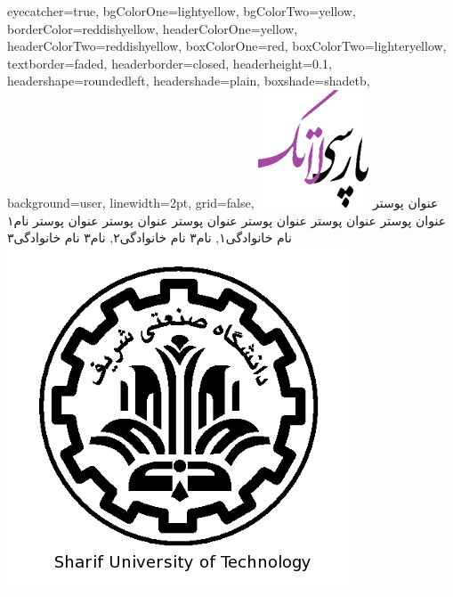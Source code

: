 \documentclass[debug,a0paper,portrait,persian]{xebaposter}
\begin{document}
      \begin{poster}%
      {
      eyecatcher=true,
      bgColorOne=lightyellow,
      bgColorTwo=yellow,
      borderColor=reddishyellow,
      headerColorOne=yellow,
      headerColorTwo=reddishyellow,
      boxColorOne=red,
      boxColorTwo=lighteryellow,
      textborder=faded,
      headerborder=closed,
      headerheight=0.1\textheight,
      headershape=roundedleft,
      headershade=plain,
      boxshade=shadetb,%
      background=user,%
      linewidth=2pt,
      grid=false,
      }
 {
      \includegraphics[height=0.07\textheight]{logo}
 }
 {عنوان پوستر عنوان پوستر عنوان پوستر عنوان پوستر عنوان پوستر عنوان پوستر عنوان پوستر 
}
 {\large نام۱ نام خانوادگی۱, نام۳ نام خانوادگی۲, نام۳ نام خانوادگی۳ 
 \\%
 {\normalsize\texttt{}}}
 {
    \includegraphics[height=0.07 \textheight]{shariflogo}
 }



\end{poster}
\end{document}

